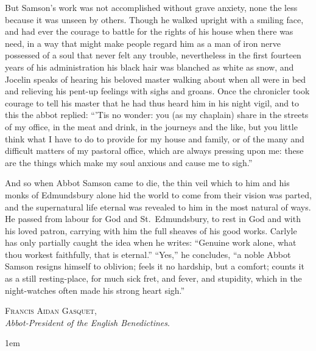 \documentclass{book}
\begin{document}
{{But Samson's work was not accomplished without grave anxiety, none the less because it was unseen by others. Though he walked upright with a smiling face, and had ever the courage to battle for the rights of his house when there was need, in a way that might make people regard him as a man of iron nerve possessed of a soul that never felt any trouble, nevertheless in the first fourteen years of his administration his black hair was blanched as white as snow, and Jocelin speaks of hearing his beloved master walking about when all were in bed and relieving his pent-up feelings with sighs and groans. Once the chronicler took courage to tell his master that he had thus heard him in his night vigil, and to this the abbot replied: ``'Tis no wonder: you (as my chaplain) share in the streets of my office, in the meat and drink, in the journeys and the like, but you little think what I have to do to provide for my house and family, or of the many and difficult matters of my pastoral office, which are always pressing upon me: these are the things which make my soul anxious and cause me to sigh.''

And so when Abbot Samson came to die, the thin veil which to him and his monks of Edmundsbury alone hid the world to come from their vision was parted, and the supernatural life eternal was revealed to him in the most natural of ways. He passed from labour for God and St.\ Edmundsbury, to rest in God and with his loved patron, carrying with him the full sheaves of his good works. Carlyle has only partially caught the idea when he writes: ``Genuine work alone, what thou workest faithfully, that is eternal.'' ``Yes,'' he concludes, ``a noble Abbot Samson resigns himself to oblivion; feels it no hardship, but a comfort; counts it as a still resting-place, for much sick fret, and fever, and stupidity, which in the night-watches often made his strong heart sigh.''
}
}


\begin{flushright}
\parbox{6cm}{
\begin{center}
\textsc{Francis Aidan Gasquet},\\
\vspace{0.1cm}
\emph{Abbot-President of the English Benedictines}.
\end{center}
}
\end{flushright}

\cleardoublepage
{}
\emergencystretch 1em
\end{document}
